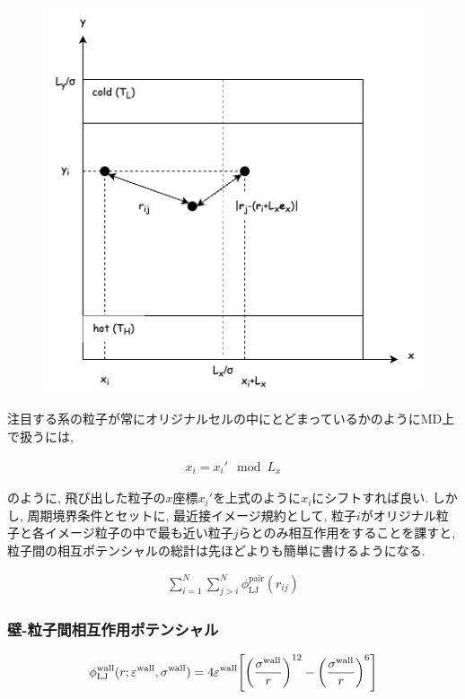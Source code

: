 \begin{figure}[H]
  \centering
  \caption{}
  \label{fig:system_periodic}
  \includegraphics[scale=0.7]{image/system_periodic.jpg}
\end{figure}

注目する系の粒子が常にオリジナルセルの中にとどまっているかのようにMD上で扱うには,

\begin{align}
  x_{i} = x_{i}' \mod L_{x}
\end{align}

のように,  飛び出した粒子の$x$座標$x_{i}'$を上式のように$x_i$にシフトすれば良い. しかし, 周期境界条件とセットに, 最近接イメージ規約として, 粒子$i$がオリジナル粒子と各イメージ粒子の中で最も近い粒子$j$らとのみ相互作用をすることを課すと, 粒子間の相互ポテンシャルの総計は先ほどよりも簡単に書けるようになる.

\begin{align}
  \sum_{i=1}^{N} \sum_{j > i}^{N} \phi_{\text{LJ}}^{\text{pair}} (r_{ij})
\end{align}

\subsubsection{壁-粒子間相互作用ポテンシャル}

\begin{align}
  \phi_{\text{LJ}}^{\text{wall}}(r; \varepsilon^{\text{wall}}, \sigma^{\text{wall}}) = 4\varepsilon^{\text{wall}} \qty[\qty(\frac{\sigma^{\text{wall}}}{r})^{12} - \qty(\frac{\sigma^{\text{wall}}}{r})^{6} ] \\
\end{align}


